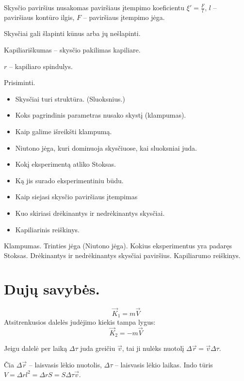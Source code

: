 Skysčio paviršius nusakomas paviršiaus įtempimo koeficientu
$\xi' = \frac{F}{l}$, $l$ – paviršiaus kontūro ilgis, $F$ – paviršiaus
įtempimo jėga.

Skysčiai gali šlapinti kūnus arba jų nešlapinti.

Kapiliariškumas – skysčio pakilimas kapiliare.

$r$ – kapiliaro spindulys.

Prisiminti.
\begin{itemize}
  \item Skysčiai turi struktūra. (Sluoksnius.)
  \item Koks pagrindinis parametras nusako skystį (klampumas).
  \item Kaip galime išreikšti klampumą.
  \item Niutono jėga, kuri dominuoja skysčiuose, kai sluoksniai juda.
  \item Kokį eksperimentą atliko Stoksas.
  \item Ką jis surado eksperimentiniu būdu.
  \item Kaip siejasi skysčio paviršiaus įtempimas
  \item Kuo skiriasi drėkinantys ir nedrėkinantys skysčiai.
  \item Kapiliarinis reiškinys.
\end{itemize}

Klampumas. Trinties jėga (Niutono jėga). Kokius eksperimentus yra padaręs
Stoksas. Drėkinantys ir nedrėkinantys skysčiai paviršius. Kapiliarumo
reiškinys.

\section{Dujų savybės.}

\begin{equation*}
  \vec{K}_{1} = m \vec{V}
\end{equation*}
Atsitrenkusios dalelės judėjimo kiekis tampa lygus:
\begin{equation*}
  \vec{K}_{2} = -m \vec{V}
\end{equation*}

Jeigu dalelė per laiką $\Delta \tau$ juda greičiu $\vec{v}$, tai ji
nulėks nuotolį $\Delta \vec{r} = \vec{v} \Delta \tau$.

Čia $\Delta \vec{r}$ – laisvasis lėkio nuotolis, $\Delta \tau$ – laisvasis
lėkio laikas.
Indo tūris $V= \Delta r l^{2} = \Delta r S = S \Delta \tau \vec{v}$.

